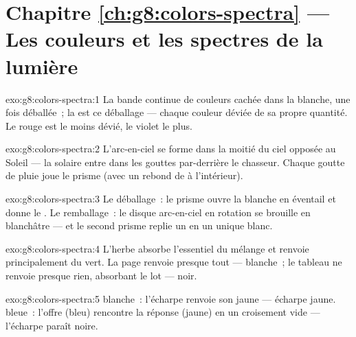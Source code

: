 \section*{Chapitre \ref{ch:g8:colors-spectra} --- Les couleurs et les spectres de la lumière}

\begin{solution}{exo:g8:colors-spectra:1}
La bande continue de couleurs cachée dans la  blanche, une fois
déballée~; la  est ce déballage --- chaque couleur déviée de
sa propre quantité. Le rouge est le moins dévié, le violet le plus.
\end{solution}

\begin{solution}{exo:g8:colors-spectra:2}
L'arc-en-ciel se forme dans la moitié du ciel opposée au Soleil --- la
 solaire entre dans les gouttes par-derrière le chasseur.
Chaque goutte de pluie joue le prisme (avec un rebond de  à
l'intérieur).
\end{solution}

\begin{solution}{exo:g8:colors-spectra:3}
Le déballage~: le prisme ouvre la  blanche en éventail et donne
le . Le remballage~: le disque arc-en-ciel en rotation se
brouille en blanchâtre --- et le second prisme replie un  en un
unique  blanc.
\end{solution}

\begin{solution}{exo:g8:colors-spectra:4}
L'herbe absorbe l'essentiel du mélange et renvoie principalement du
vert. La page renvoie presque tout --- blanche~; le tableau ne renvoie
presque rien, absorbant le lot --- noir.
\end{solution}

\begin{solution}{exo:g8:colors-spectra:5}
 blanche~: l'écharpe renvoie son jaune --- écharpe jaune.
 bleue~: l'offre (bleu) rencontre la réponse (jaune) en un
croisement vide --- l'écharpe paraît noire.
\end{solution}

